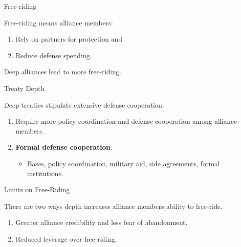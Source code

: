 \documentclass[12pt]{beamer}
\begin{document}

\begin{frame}{Free-riding}

Free-riding means alliance members:

\begin{enumerate} 
\pause
\item Rely on partners for protection and  
\pause
\item Reduce defense spending.
\end{enumerate}  

\end{frame}


\begin{frame}[standout]

Deep alliances lead to more free-riding.   

\end{frame}


\begin{frame}{Treaty Depth}

Deep treaties stipulate extensive defense cooperation. 

\begin{enumerate} 
\pause
\item Require more policy coordination and defense cooperation among alliance members. 
\item \textbf{Formal defense cooperation}:
\pause
\begin{itemize}
\item Bases, policy coordination, military aid, side agreements, formal institutions. 
\end{itemize}  
\end{enumerate}  

\end{frame}



\begin{frame}{Limits on Free-Riding}

There are two ways depth increases alliance members ability to free-ride. 

\begin{enumerate}
\pause
\item Greater alliance credibility and less fear of abandonment.   
\pause
\item Reduced leverage over free-riding.
\end{enumerate}

\end{frame}
\end{document}
